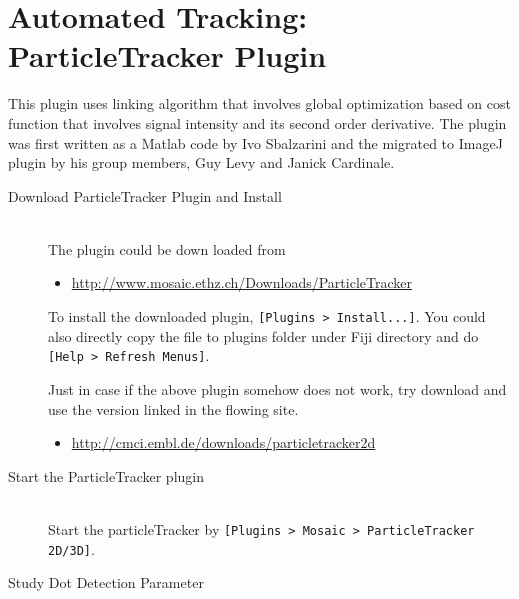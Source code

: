 \documentclass[11pnt]{article}
\begin{document}
\section{Automated Tracking: ParticleTracker Plugin}

This plugin uses linking algorithm that involves global optimization based on cost function that involves signal intensity and its second order derivative. The plugin was first written as a Matlab code by Ivo Sbalzarini and the migrated to ImageJ plugin by his group members, Guy Levy and Janick Cardinale.

\begin{description}

\item[Download ParticleTracker Plugin and Install]\hfill\\

The plugin could be down loaded from
\begin{itemize}
\item \url{http://www.mosaic.ethz.ch/Downloads/ParticleTracker}
\end{itemize}
To install the downloaded plugin, \verb"[Plugins > Install...]". You could also directly copy the file to plugins folder under Fiji directory and do \verb"[Help > Refresh Menus]".

Just in case if the above plugin somehow does not work, try download and use the version linked in the flowing site. 

\begin{itemize}
\item \url{http://cmci.embl.de/downloads/particletracker2d}
\end{itemize}

\item[Start the ParticleTracker plugin]\hfill\\

Start the particleTracker by \verb"[Plugins > Mosaic > ParticleTracker 2D/3D]". 

\item[Study Dot Detection Parameter]\hfill\\


\end{description}
\end{document}
